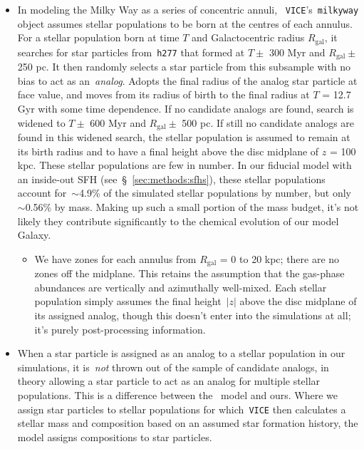 \documentclass[fleqn, usenatbib]{mnras}
\begin{document}
\begin{itemize}
	\item In modeling the Milky Way as a series of concentric annuli,
	~\texttt{VICE}'s~\texttt{milkyway} object assumes stellar populations to 
	be born at the centres of each annulus. 
	For a stellar population born at time $T$ and Galactocentric radius 
	$R_\text{gal}$, it searches for star particles from~\texttt{h277} that formed at $T \pm$ 300 Myr and $R_\text{gal} \pm$ 250 pc. It then randomly 
	selects a star particle from this subsample with no bias to act as 
	an~\textit{analog}. Adopts the final radius of the analog star particle at 
	face value, and moves from its radius of birth to the final radius at $T$ 
	= 12.7 Gyr with some time dependence. If no candidate analogs are found, 
	search is widened to $T \pm$ 600 Myr and $R_\text{gal} \pm$ 500 pc. If 
	still no candidate analogs are found in this widened search, the stellar 
	population is assumed to remain at its birth radius {\color{red} and to 
	have a final height above the disc midplane of $z$ = 100 kpc.} These 
	stellar populations are few in number. In our fiducial model with an 
	inside-out SFH (see~\S~\ref{sec:methods:sfhs}), these stellar populations 
	account for~$\sim$4.9\% of the simulated stellar populations by number, 
	but only~$\sim$0.56\% by mass. Making up such a small portion of the mass 
	budget, it's not likely they contribute significantly to the chemical 
	evolution of our model Galaxy. 
	\begin{itemize} 
		\item We have zones for each annulus from $R_\text{gal}$ = 0 to 
		20 kpc; there are no zones off the midplane. This retains the 
		assumption that the gas-phase abundances are vertically and 
		azimuthally well-mixed. Each stellar population simply assumes the 
		final height~$\left|z\right|$ above the disc midplane of its assigned 
		analog, though this doesn't enter into the simulations at all; it's 
		purely post-processing information. 
	\end{itemize} 

	\item When a star particle is assigned as an analog to a stellar 
	population in our simulations, it is~\textit{not} thrown out of the sample 
	of candidate analogs, in theory allowing a star particle to act as an 
	analog for multiple stellar populations. This is a difference between 
	the~\citet{Minchev2013} model and ours. Where we assign star particles to 
	stellar populations for which~\texttt{VICE} then calculates a stellar mass 
	and composition based on an assumed star formation history, the 
	\citet{Minchev2013} model assigns compositions to star particles. 


\end{itemize}
\end{document}
